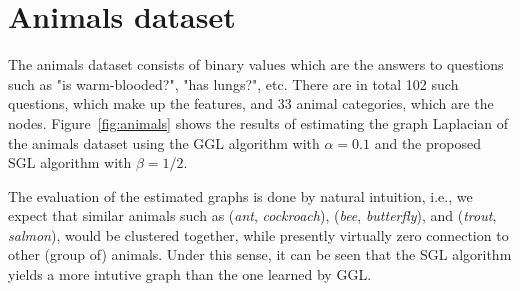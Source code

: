 \section{Animals dataset}

The \textsf{animals} dataset consists of binary values which are the answers to questions such as
"is warm-blooded?", "has lungs?", etc. There are in total 102 such questions, which make up the features, and
33 animal categories, which are the nodes. Figure~\ref{fig:animals} shows the results of estimating the
graph Laplacian of the \textsf{animals} dataset using the \textsf{GGL} algorithm with $\alpha = 0.1$ and
the proposed \textsf{SGL} algorithm with $\beta = 1/2$.

The evaluation of the estimated graphs is done by natural intuition, i.e., we expect that similar animals
such as (\textit{ant}, \textit{cockroach}), (\textit{bee}, \textit{butterfly}), and
(\textit{trout}, \textit{salmon}), would be clustered together, while presently virtually zero connection to
other (group of) animals. Under this sense, it can be seen that the \textsf{SGL} algorithm yields a more intutive
graph than the one learned by \textsf{GGL}.

